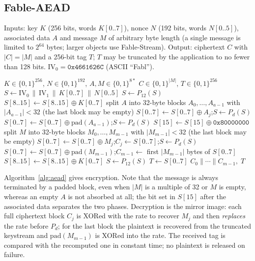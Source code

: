 \documentclass{iacrtrans}
\newcommand{\FableAEAD}{\textsf{Fable-AEAD}\xspace}
\newcommand{\FableStream}{\textsf{Fable-Stream}\xspace}
\newcommand{\PP}[1]{P_{#1}}
\begin{document}
\subsection{\FableAEAD}
\label{sec:aead}
Inputs: key $K$ (256 bits, words $K[0..7]$), nonce $N$ (192 bits, words $N[0..5]$), associated data $A$ and message $M$ of arbitrary byte length (a single message is limited to $2^{64}$ bytes; larger objects use \FableStream). Output: ciphertext $C$ with $|C| = |M|$ and a 256-bit tag $T$; $T$ may be truncated by the application to no fewer than 128 bits. $\mathrm{IV}_0 = \texttt{0x4661626C}$ (ASCII ``Fabl'').

\begin{algorithm}[htb]
\caption{\FableAEAD encryption, parameter set with data-phase rounds $d$ and constant $\mathrm{IV}_1$}
\label{alg:aead}
\begin{algorithmic}[1]
\Require $K \in \{0,1\}^{256}$, $N \in \{0,1\}^{192}$, $A, M \in \{0,1\}^{8*}$
\Ensure $C \in \{0,1\}^{|M|}$, $T \in \{0,1\}^{256}$
\State $S \gets \mathrm{IV}_0 \,\|\, \mathrm{IV}_1 \,\|\, K[0..7] \,\|\, N[0..5]$ 
\State $S \gets \PP{12}(S)$
\State $S[8..15] \gets S[8..15] \oplus K[0..7]$ 
  \State split $A$ into 32-byte blocks $A_0,\ldots,A_{a-1}$ with $|A_{a-1}| < 32$ (the last block may be empty)
    \State $S[0..7] \gets S[0..7] \oplus A_j$;\quad $S \gets \PP{d}(S)$
  \EndFor
  \State $S[0..7] \gets S[0..7] \oplus \mathrm{pad}(A_{a-1})$;\quad $S \gets \PP{d}(S)$
\EndIf
\State $S[15] \gets S[15] \oplus \texttt{0x80000000}$ 
\State split $M$ into 32-byte blocks $M_0,\ldots,M_{m-1}$ with $|M_{m-1}| < 32$ (the last block may be empty)
  \State $S[0..7] \gets S[0..7] \oplus M_j$;\quad $C_j \gets S[0..7]$;\quad $S \gets \PP{d}(S)$
\EndFor
\State $S[0..7] \gets S[0..7] \oplus \mathrm{pad}(M_{m-1})$;\quad $C_{m-1} \gets$ first $|M_{m-1}|$ bytes of $S[0..7]$
\State $S[8..15] \gets S[8..15] \oplus K[0..7]$ 
\State $S \gets \PP{12}(S)$
\State $T \gets S[0..7]$ 
\State \Return $C_0 \| \cdots \| C_{m-1},\; T$
\end{algorithmic}
\end{algorithm}

Algorithm~\ref{alg:aead} gives encryption. Note that the message is always terminated by a padded block, even when $|M|$ is a multiple of 32 or $M$ is empty, whereas an empty $A$ is not absorbed at all; the bit set in $S[15]$ after the associated data separates the two phases. Decryption is the mirror image: each full ciphertext block $C_j$ is XORed with the rate to recover $M_j$ and then \emph{replaces} the rate before $\PP{d}$; for the last block the plaintext is recovered from the truncated keystream and $\mathrm{pad}(M_{m-1})$ is XORed into the rate. The received tag is compared with the recomputed one in constant time; no plaintext is released on failure.
\end{document}
